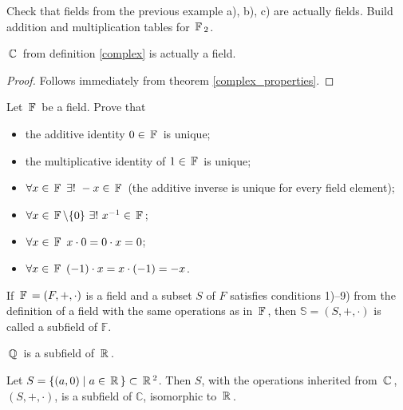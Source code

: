 \begin{exercise}
    Check that fields from the previous example a), b), c) are actually fields. Build addition and multiplication tables for $\,\mathbb{F}\,_2$.
\end{exercise}

\begin{theorem}\label{c_field}
$\,\mathbb{C}\,$ from definition \ref{complex} is actually a field.
\end{theorem}

\begin{proof}
    Follows immediately from theorem \ref{complex_properties}.
\end{proof}

\begin{exercise}
    Let $\,\mathbb{F}\,$ be a field. Prove that
    \begin{itemize}
        \item [a) ] the additive identity $0\in \,\mathbb{F}\,$ is unique;
        \item [b) ] the multiplicative identity of $1\in \,\mathbb{F}\,$ is unique;
        \item [c) ] $\forall x\in \,\mathbb{F}\,~\exists !~-x\in \,\mathbb{F}\,$ (the additive inverse is unique for every field element);
        \item [d) ] $\forall x\in\,\mathbb{F}\,\backslash\{0\}~\exists ! ~x^{-1}\in\,\mathbb{F}\,$;
        \item [e) ] $\forall x\in \,\mathbb{F}\, ~x\cdot 0 = 0\cdot x = 0$;
        \item [f) ] $\forall x\in \,\mathbb{F}\, ~(-1) \cdot x=x\cdot(-1)=-x $.
    \end{itemize}
\end{exercise}

\begin{definition}
 If $\,\mathbb{F}\,=(F,+, \cdot)$ is a field and a subset $S$ of $F$ satisfies conditions 1)--9) from the definition of a field with the same operations as in $\,\mathbb{F}\,$, then $\mathbb{S}=(S,+, \cdot)$ is called a subfield of $\mathbb{F}$.
\end{definition}

\begin{example}
$\,\mathbb{Q}\,$ is a subfield of $\,\mathbb{R}\,$.        
\end{example}

\begin{lemma}
Let $S=\{(a, 0) \mid a \in \,\mathbb{R}\,\} \subset \,\mathbb{R}\,^2$. Then $S$, with the operations inherited from $\,\mathbb{C}\,$, $(S,+, \cdot)$, is a subfield of $\mathbb{C}$, isomorphic to $\,\mathbb{R}\,$.
\end{lemma}

